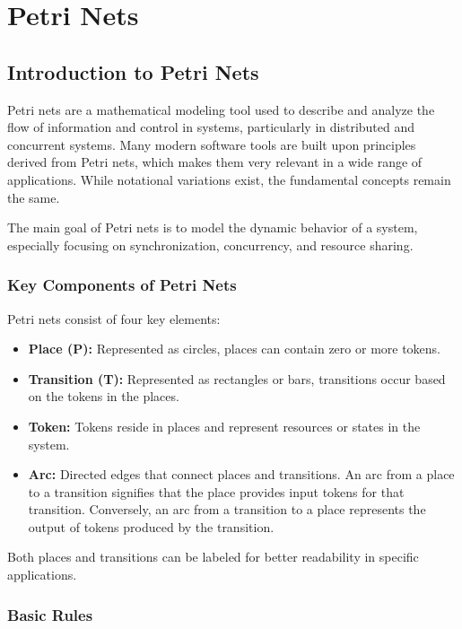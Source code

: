 \chapter{Petri Nets}
    \section{Introduction to Petri Nets}
    
    Petri nets are a mathematical modeling tool used to describe and analyze the flow of information and control in systems, particularly in distributed and concurrent systems. Many modern software tools are built upon principles derived from Petri nets, which makes them very relevant in a wide range of applications. While notational variations exist, the fundamental concepts remain the same.
    
    The main goal of Petri nets is to model the dynamic behavior of a system, especially focusing on synchronization, concurrency, and resource sharing.
    
    \subsection{Key Components of Petri Nets}
    
    Petri nets consist of four key elements:
    \begin{itemize}
        \item \textbf{Place (P):} Represented as circles, places can contain zero or more tokens.
        \item \textbf{Transition (T):} Represented as rectangles or bars, transitions occur based on the tokens in the places.
        \item \textbf{Token:} Tokens reside in places and represent resources or states in the system.
        \item \textbf{Arc:} Directed edges that connect places and transitions. An arc from a place to a transition signifies that the place provides input tokens for that transition. Conversely, an arc from a transition to a place represents the output of tokens produced by the transition.
    \end{itemize}
    
    Both places and transitions can be labeled for better readability in specific applications.
    
    \subsection{Basic Rules}
    
